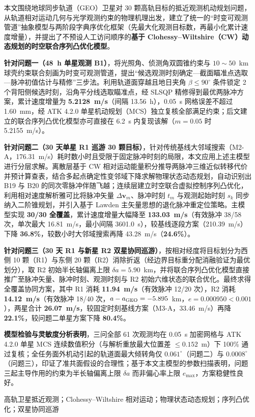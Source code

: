 本文围绕地球同步轨道（GEO）卫星对 30 颗高轨目标的抵近观测机动规划问题，从轨道相对运动几何与光学观测约束的物理机理出发，建立了统一的“时变可观测管道”抽象模型与两阶段字典序优化框架（先最大化观测目标数，再最小化累计速度增量），并提出了不预设人工访问顺序的\textbf{基于 Clohessy--Wiltshire（CW）动态规划的时空联合序列凸优化模型}。

\textbf{针对问题一（48~h 单星观测 B1）}，将光照角、侦测角双圆锥约束与 $10\sim 50$~km 球壳约束联合刻画为时变可观测管道，提出“候选观测时刻确定—截面瞄准点选取—脉冲初值估计与精修”三步法。利用轨道面穿越且地日夹角 $\beta \le 90^\circ$ 条件锁定 2 个背阳侧候选时刻，沿角平分线选取瞄准点，经 SLSQP 精修得到最优两脉冲方案，累计速度增量为 \textbf{5.2128~m/s}（间隔 13.56~h），0.05~s 网格误差不超过 1.60~mm，经 ATK 4.2.0\cite{atk4} 单星机动规划（MCS）独立复核全部满足约束；后文建立的联合序列凸优化模型亦可直接在 6.2~s 内复现该解（$m=0.05$ 时 5.2155~m/s）。

\textbf{针对问题二（30 天单星 R1 巡游 30 颗目标）}，针对传统基线大邻域搜索（M2-A，176.31~m/s）耗时数小时且受限于固定脉冲时刻的局限，本文应用上述主模型进行分层求解。离散层基于 CW 相对运动能量积分推导两脉冲三维近似转移代价并预计算查表，结合多起点确定性变邻域下降求解物理状态动态规划，自动识别出 B19 与 B20 的同次零脉冲伴随飞越；连续层建立时空联合虚拟控制序列凸优化，利用相对速度解析雅可比将脉冲矢量 $\Delta\bm v_m$、脉冲时刻 $t_m$ 与观测起始时刻 $s_k$ 同步纳入二阶锥规划，并引入基于 Lawden 主矢量思想的退化脉冲重定位策略。主模型实现 \textbf{30/30 全覆盖}，累计速度增量大幅降至 \textbf{133.03~m/s}（有效脉冲 38/58 次，单次最大 16.81~m/s，最小间隔 3601.0~s），较基线逐段方案（210.39~m/s）下降 \textbf{36.8\%}，较数小时大邻域搜索再降 43.28~m/s（\textbf{24.6\%}）。

\textbf{针对问题三（30 天 R1 与新星 R2 双星协同巡游）}，按相对经度将目标划分为西侧 10 颗（R1）与东侧 20 颗（R2）消除折返（经边界目标重分配消融验证为最优划分），取 R2 初始半长轴偏离上限 $\delta a = 5.90$~km，并将联合序列凸优化模型直接推广至脉冲矢量、脉冲时刻、观测时刻与 R2 初始六维状态的联合优化。最终求得全覆盖协同方案，其中 R1 消耗 \textbf{11.94~m/s}（有效脉冲 12/20 次），R2 消耗 \textbf{14.12~m/s}（有效脉冲 18/40 次，$a - a_{\mathrm{GEO}} = -5.895$~km，$e = 0.000950 < 0.001$），两星合计 \textbf{26.07~m/s}，较固定时刻基线方案（M3-A，33.46~m/s）再降 \textbf{22.1\%}，较问题二单星方案下降 \textbf{80.4\%}。

\textbf{模型检验与灵敏度分析表明}，三问全部 61 次观测均在 0.05~s 加密网格与 ATK 4.2.0 单星 MCS 连续数值积分（与解析重放最大位置差 $\le 0.152$~m）下 100\% 通过复核；全任务面外机动引起的轨道面最大倾转角仅 $0.061^\circ$（问题二）与 $0.0008^\circ$（问题三），印证了准共面假设的合理性；基于本文主模型的参数扫描表明，问题三起主导作用的约束为半长轴偏离上限 $\delta a$ 而非偏心率上限 $e_{\max}$，方案稳健性良好。

\vspace{4pt}
高轨卫星抵近观测；Clohessy--Wiltshire 相对运动；物理状态动态规划；序列凸优化；双星协同巡游
